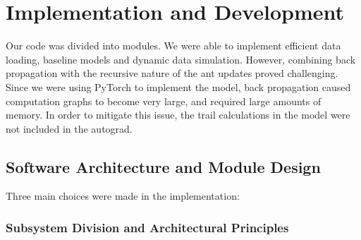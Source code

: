 \chapter{Implementation and Development}
\label{ch:implement}
\label{chap:implementation}



Our code was divided into modules. We were able to implement efficient data loading, baseline models and dynamic data simulation. However, combining back propagation with the recursive nature of the ant updates proved challenging. Since we were using PyTorch to implement the model, back propagation caused computation graphs to become very large, and required large amounts of memory. In order to mitigate this issue, the trail calculations in the model were not included in the autograd.

\section[Software Architecture and Module Design]{Software Architecture and Module Design}
\label{sec:module_design}
\label{sec:module_description}

Three main choices were made in the implementation:

\subsection{Subsystem Division and Architectural Principles}

